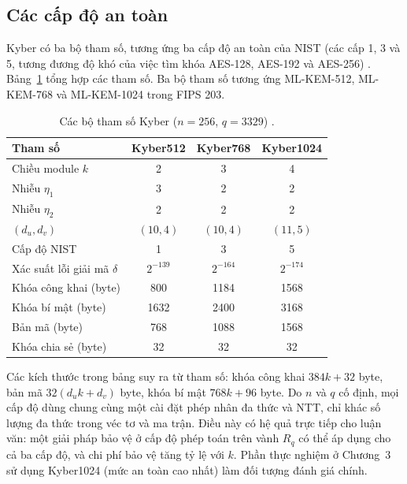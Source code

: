 \documentclass[../LuanVan.tex]{subfiles}
\begin{document}
\subsection{Các cấp độ an toàn}\label{subsec:levels}

Kyber có ba bộ tham số, tương ứng ba cấp độ an toàn của NIST (các cấp 1, 3 và 5, tương đương độ khó của việc tìm khóa AES-128, AES-192 và AES-256) \cite{Avanzi21,FIPS203}. Bảng~\ref{tab:params} tổng hợp các tham số. Ba bộ tham số tương ứng ML-KEM-512, ML-KEM-768 và ML-KEM-1024 trong FIPS 203.

\begin{table}[H]
\centering
\caption{Các bộ tham số Kyber ($n=256$, $q=3329$) \cite{Avanzi21,FIPS203}.}
\label{tab:params}
\begin{tabular}{l|ccc}
\hline
\textbf{Tham số} & \textbf{Kyber512} & \textbf{Kyber768} & \textbf{Kyber1024} \\ \hline
Chiều module $k$ & 2 & 3 & 4 \\
Nhiễu $\eta_1$ & 3 & 2 & 2 \\
Nhiễu $\eta_2$ & 2 & 2 & 2 \\
$(d_u,d_v)$ & $(10,4)$ & $(10,4)$ & $(11,5)$ \\
Cấp độ NIST & 1 & 3 & 5 \\
Xác suất lỗi giải mã $\delta$ & $2^{-139}$ & $2^{-164}$ & $2^{-174}$ \\ \hline
Khóa công khai (byte) & 800 & 1184 & 1568 \\
Khóa bí mật (byte) & 1632 & 2400 & 3168 \\
Bản mã (byte) & 768 & 1088 & 1568 \\
Khóa chia sẻ (byte) & 32 & 32 & 32 \\ \hline
\end{tabular}
\end{table}

Các kích thước trong bảng suy ra từ tham số: khóa công khai $384k+32$ byte, bản mã $32(d_uk+d_v)$ byte, khóa bí mật $768k+96$ byte. Do $n$ và $q$ cố định, mọi cấp độ dùng chung cùng một cài đặt phép nhân đa thức và NTT, chỉ khác số lượng đa thức trong véc tơ và ma trận. Điều này có hệ quả trực tiếp cho luận văn: một giải pháp bảo vệ ở cấp độ phép toán trên vành $R_q$ có thể áp dụng cho cả ba cấp độ, và chi phí bảo vệ tăng tỷ lệ với $k$. Phần thực nghiệm ở Chương~3 sử dụng Kyber1024 (mức an toàn cao nhất) làm đối tượng đánh giá chính.

\end{document}

